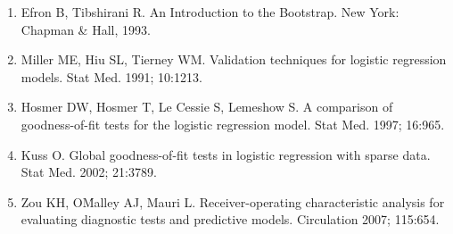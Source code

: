 \documentclass[12pt]{article}
\begin{document}
\begin{enumerate}
  \item Efron B, Tibshirani R. An Introduction to the Bootstrap. New York: Chapman \& Hall, 1993.
  \item Miller ME, Hiu SL, Tierney WM. Validation techniques for logistic regression models. Stat Med. 1991; 10:1213.
  \item Hosmer DW, Hosmer T, Le Cessie S, Lemeshow S. A comparison of goodness-of-fit tests for the logistic regression model. Stat Med. 1997; 16:965.
  \item Kuss O. Global goodness-of-fit tests in logistic regression with sparse data. Stat Med. 2002; 21:3789.
  \item Zou KH, O\'Malley AJ, Mauri L. Receiver-operating characteristic analysis for evaluating diagnostic tests and predictive models. Circulation 2007; 115:654.
\end{enumerate}
\end{document}
